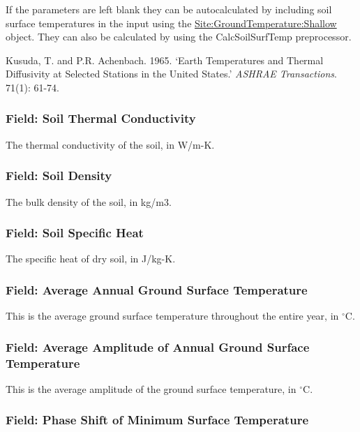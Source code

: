 If the parameters are left blank they can be autocalculated by including soil surface temperatures in the input using the \hyperref[sitegroundtemperatureshallow]{Site:GroundTemperature:Shallow} object. They can also be calculated by using the CalcSoilSurfTemp preprocessor.

Kusuda, T. and P.R. Achenbach. 1965. `Earth Temperatures and Thermal Diffusivity at Selected Stations in the United States.' \emph{ASHRAE Transactions}. 71(1): 61-74.

\subsubsection{Field: Soil Thermal Conductivity}\label{field-soil-thermal-conductivity-1}

The thermal conductivity of the soil, in W/m-K.

\subsubsection{Field: Soil Density}\label{field-soil-density-1}

The bulk density of the soil, in kg/m3.

\subsubsection{Field: Soil Specific Heat}\label{field-soil-specific-heat-1}

The specific heat of dry soil, in J/kg-K.

\subsubsection{Field: Average Annual Ground Surface Temperature}\label{field-average-annual-ground-surface-temperature}

This is the average ground surface temperature throughout the entire year, in $^\circ$C.

\subsubsection{Field: Average Amplitude of Annual Ground Surface Temperature}\label{field-average-amplitude-of-annual-ground-surface-temperature}

This is the average amplitude of the ground surface temperature, in $^\circ$C.

\subsubsection{Field: Phase Shift of Minimum Surface Temperature}\label{field-phase-shift-of-minimum-surface-temperature}

